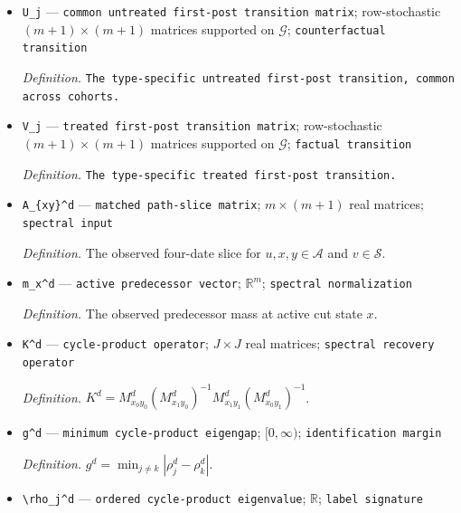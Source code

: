 \documentclass{article}
\begin{document}
\begin{itemize}
  \par\smallskip\noindent\emph{Definition.} \texttt{The type-\allowbreak{}specific untreated date-\allowbreak{}1-\allowbreak{}to-\allowbreak{}date-\allowbreak{}2 transition,\allowbreak{} common across cohorts.}
  \item \texttt{U\_\allowbreak{}j} --- \texttt{common untreated first-\allowbreak{}post transition matrix}; row-stochastic \((m+1)\times(m+1)\) matrices supported on \(\mathcal G\); \texttt{counterfactual transition}
  \par\smallskip\noindent\emph{Definition.} \texttt{The type-\allowbreak{}specific untreated first-\allowbreak{}post transition,\allowbreak{} common across cohorts.}
  \item \texttt{V\_\allowbreak{}j} --- \texttt{treated first-\allowbreak{}post transition matrix}; row-stochastic \((m+1)\times(m+1)\) matrices supported on \(\mathcal G\); \texttt{factual transition}
  \par\smallskip\noindent\emph{Definition.} \texttt{The type-\allowbreak{}specific treated first-\allowbreak{}post transition.}
  \item \texttt{A\_\allowbreak{}\{xy\}\allowbreak{}\textasciicircum{}d} --- \texttt{matched path-\allowbreak{}slice matrix}; \(m\times(m+1)\) real matrices; \texttt{spectral input}
  \par\smallskip\noindent\emph{Definition.} The observed four-date slice for \(u,x,y\in\mathcal A\) and \(v\in\mathcal S\).
  \item \texttt{m\_\allowbreak{}x\textasciicircum{}d} --- \texttt{active predecessor vector}; \(\mathbb R^m\); \texttt{spectral normalization}
  \par\smallskip\noindent\emph{Definition.} The observed predecessor mass at active cut state \(x\).
  \item \texttt{K\textasciicircum{}d} --- \texttt{cycle-\allowbreak{}product operator}; \(J\times J\) real matrices; \texttt{spectral recovery operator}
  \par\smallskip\noindent\emph{Definition.} \(K^d=M_{x_0y_0}^d(M_{x_1y_0}^d)^{-1}M_{x_1y_1}^d(M_{x_0y_1}^d)^{-1}\).
  \item \texttt{g\textasciicircum{}d} --- \texttt{minimum cycle-\allowbreak{}product eigengap}; \([0,\infty)\); \texttt{identification margin}
  \par\smallskip\noindent\emph{Definition.} \(g^d=\min_{j\neq k}|\rho_j^d-\rho_k^d|\).
  \item \texttt{\textbackslash{}\allowbreak{}rho\_\allowbreak{}j\textasciicircum{}d} --- \texttt{ordered cycle-\allowbreak{}product eigenvalue}; \(\mathbb R\); \texttt{label signature}

\end{itemize}
\end{document}
